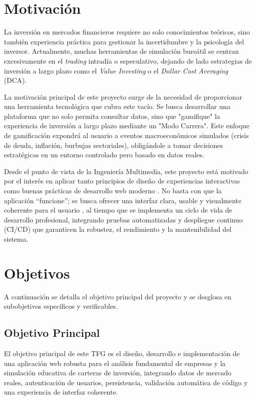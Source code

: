 \section{Motivación}

La inversión en mercados financieros requiere no solo conocimientos teóricos, sino también experiencia práctica para gestionar la incertidumbre y la psicología del inversor. Actualmente, muchas herramientas de simulación bursátil se centran excesivamente en el \textit{trading} intradía o especulativo, dejando de lado estrategias de inversión a largo plazo como el \textit{Value Investing} \cite{graham_investor} o el \textit{Dollar Cost Averaging} (DCA).

La motivación principal de este proyecto surge de la necesidad de proporcionar una herramienta tecnológica que cubra este vacío. Se busca desarrollar una plataforma que no solo permita consultar datos, sino que "gamifique" la experiencia de inversión a largo plazo mediante un "Modo Carrera". Este enfoque de gamificación \cite{deterding_gamification} expondrá al usuario a eventos macroeconómicos simulados (crisis de deuda, inflación, burbujas sectoriales), obligándole a tomar decisiones estratégicas en un entorno controlado pero basado en datos reales.

Desde el punto de vista de la Ingeniería Multimedia, este proyecto está motivado por el interés en aplicar tanto principios de diseño de experiencias interactivas como buenas prácticas de desarrollo web moderno \cite{clean_code}. No basta con que la aplicación “funcione”; se busca ofrecer una interfaz clara, usable y visualmente coherente para el usuario \cite{krug_usability}, al tiempo que se implementa un ciclo de vida de desarrollo profesional, integrando pruebas automatizadas y despliegue continuo (CI/CD) que garanticen la robustez, el rendimiento y la mantenibilidad del sistema.

\section{Objetivos}

A continuación se detalla el objetivo principal del proyecto y se desglosa en subobjetivos específicos y verificables.

\subsection{Objetivo Principal}

El objetivo principal de este TFG es el diseño, desarrollo e implementación de una aplicación web robusta para el análisis fundamental de empresas y la simulación educativa de carteras de inversión, integrando datos de mercado reales, autenticación de usuarios, persistencia, validación automática de código y una experiencia de interfaz coherente.

